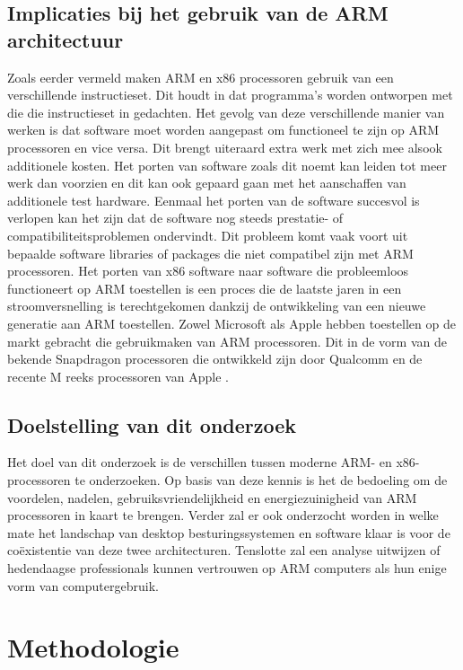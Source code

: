 \subsection{Implicaties bij het gebruik van de ARM architectuur}
Zoals eerder vermeld maken ARM en x86 processoren gebruik van een verschillende instructieset. Dit houdt in dat programma’s worden ontworpen met die die instructieset in gedachten. Het gevolg van deze verschillende manier van werken is dat software moet worden aangepast om functioneel te zijn op ARM processoren en vice versa. Dit brengt uiteraard extra werk met zich mee alsook additionele kosten. Het porten van software zoals dit noemt kan leiden tot meer werk dan voorzien en dit kan ook gepaard gaan met het aanschaffen van additionele test hardware. Eenmaal het porten van de software succesvol is verlopen kan het zijn dat de software nog steeds prestatie- of compatibiliteitsproblemen ondervindt. Dit probleem komt vaak voort uit bepaalde software libraries of packages die niet compatibel zijn met ARM processoren. Het porten van x86 software naar software die probleemloos functioneert op ARM toestellen is een proces die de laatste jaren in een stroomversnelling is terechtgekomen dankzij de ontwikkeling van een nieuwe generatie aan ARM toestellen. Zowel Microsoft als Apple hebben toestellen op de markt gebracht die gebruikmaken van ARM processoren. Dit in de vorm van de bekende Snapdragon processoren die ontwikkeld zijn door Qualcomm en de recente M reeks processoren van Apple \autocite{Ford2021}.

\subsection{Doelstelling van dit onderzoek}
Het doel van dit onderzoek is de verschillen tussen moderne ARM- en x86-processoren te onderzoeken. Op basis van deze kennis is het de bedoeling om de voordelen, nadelen, gebruiksvriendelijkheid en energiezuinigheid van ARM processoren in kaart te brengen.
Verder zal er ook onderzocht worden in welke mate het landschap van desktop besturingssystemen en software klaar is voor de coëxistentie van deze twee architecturen. Tenslotte zal een analyse uitwijzen of hedendaagse professionals kunnen vertrouwen op ARM computers als hun enige vorm van computergebruik.

\section{Methodologie}
\label{sec:methodologie}

